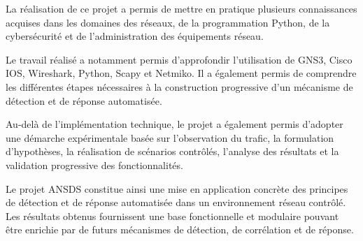 La réalisation de ce projet a permis de mettre en pratique plusieurs connaissances acquises dans les domaines des réseaux, de la programmation Python, de la cybersécurité et de l'administration des équipements réseau.

Le travail réalisé a notamment permis d'approfondir l'utilisation de GNS3, Cisco IOS, Wireshark, Python, Scapy et Netmiko. Il a également permis de comprendre les différentes étapes nécessaires à la construction progressive d'un mécanisme de détection et de réponse automatisée.

Au-delà de l'implémentation technique, le projet a également permis d'adopter une démarche expérimentale basée sur l'observation du trafic, la formulation d'hypothèses, la réalisation de scénarios contrôlés, l'analyse des résultats et la validation progressive des fonctionnalités.

Le projet ANSDS constitue ainsi une mise en application concrète des principes de détection et de réponse automatisée dans un environnement réseau contrôlé. Les résultats obtenus fournissent une base fonctionnelle et modulaire pouvant être enrichie par de futurs mécanismes de détection, de corrélation et de réponse.